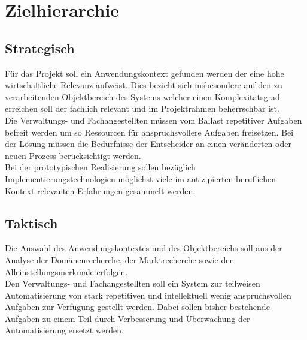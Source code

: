 \documentclass[11pt,oneside,a4paper,notitlepage]{article}
\begin{document}
%

\section{Zielhierarchie}
\label{cha:zielhierarchie}

\begin{comment}
Eine Zielhierarchie lässt sich in drei Ebenen strukturieren.
+ strategische Ziele sind Ziele, die auf langfristige Sicht erreicht werden sollen. 
	Strategische Ziele beantworten die Frage "Was soll erreicht werden?"
+ taktische Ziele sind Ziele, die auf mittelfristige Sicht erreicht werden sollen.
	Taktische Ziele beantworten die Frage "Wie soll es erreicht werden?"
+ operative Ziele sind Ziele, die auf kurzfristige Sicht erreicht werden sollen.
	Operative Ziele beantworten die Frage "durch welche Aktivitäten soll es erreicht werden?" 
Die Zielpriorisierung sollte sich durch die verwendeten Verben (muss,soll,kann) ausdrücken. 
\end{comment}


\subsection{Strategisch}
\label{sec:zielhierarchie-strategisch}

Für das Projekt soll ein Anwendungskontext gefunden werden der eine hohe wirtschaftliche Relevanz aufweist. Dies bezieht sich insbesondere auf den zu verarbeitenden Objektbereich des Systems welcher einen Komplexitätsgrad erreichen soll der fachlich relevant und im Projektrahmen beherrschbar ist.\\
Die Verwaltungs- und Fachangestellten müssen vom Ballast repetitiver Aufgaben befreit werden um so Ressourcen für anspruchsvollere Aufgaben freisetzen. Bei der Lösung müssen die Bedürfnisse der Entscheider an einen veränderten oder neuen Prozess berücksichtigt werden.\\
Bei der prototypischen Realisierung sollen bezüglich Implementierungstechnologien möglichst viele im antizipierten beruflichen Kontext relevanten Erfahrungen gesammelt werden.


%
\subsection{Taktisch}
\label{sec:zielhierarchie-taktisch}

Die Auswahl des Anwendungskontextes und des Objektbereichs soll aus der Analyse der Domänenrecherche, der Marktrecherche sowie der Alleinstellungsmerkmale erfolgen.\\
Den Verwaltungs- und Fachangestellten soll ein System zur teilweisen Automatisierung von stark repetitiven und intellektuell
wenig anspruchsvollen Aufgaben zur Verfügung gestellt werden. Dabei sollen bisher bestehende Aufgaben zu einem Teil durch Verbesserung und Überwachung der Automatisierung ersetzt werden.\\
\end{document}
